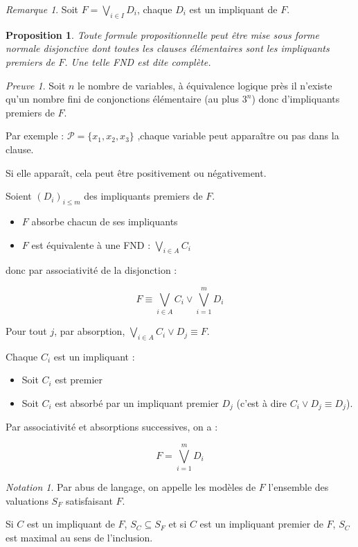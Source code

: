 \documentclass[]{article}
\newtheorem{myproposition}{Proposition}
\theoremstyle{remark}
\newtheorem{mynot}{Notation}
\newtheorem{myrem}{Remarque}
\newtheorem{myproof}{Preuve}
\theoremstyle{definition}
\begin{document}
\begin{myrem}
	Soit $\displaystyle F=\bigvee_{i \in I} D_i$, chaque $D_i$ est un impliquant de $F$.
\end{myrem}

\begin{myproposition}
	Toute formule propositionnelle peut être mise sous forme normale disjonctive dont toutes les clauses élémentaires sont les impliquants premiers de $F$. Une telle FND est dite \textit{complète}.
\end{myproposition}

\begin{myproof}
	Soit $n$ le nombre de variables, à équivalence logique près il n'existe qu'un nombre fini de conjonctions élémentaire (au plus $3^n$) donc d'impliquants premiers de $F$.

	Par exemple :
		$\mathcal{P}=\{x_1, x_2, x_3\}$ ,chaque variable peut apparaître ou pas dans la clause.
		
		Si elle apparaît, cela peut être positivement ou négativement.
	
	Soient $(D_i)_{i \leqslant m}$ des impliquants premiers de $F$.
	
	\begin{itemize}
		\item $F$ absorbe chacun de ses impliquants
		\item $F$ est équivalente à une FND : $\displaystyle \bigvee_{i \in A}C_i$
	\end{itemize}
	
	donc par associativité de la disjonction :
	
	$$F \equiv \bigvee_{i \in A} C_i \lor \bigvee_{i = 1}^m D_i$$
	
	Pour tout $j$, par absorption, $\displaystyle \bigvee_{i \in A} C_i \lor D_j \equiv F$.
	
	Chaque $C_i$ est un impliquant :
	\begin{itemize}
		\item Soit $C_i$ est premier
		\item Soit $C_i$ est absorbé par un impliquant premier $D_j$ (c'est à dire $C_i \lor D_j \equiv D_j$).
	\end{itemize}
	
	Par associativité et absorptions successives, on a :
	
	$$F = \bigvee_{i = 1}^m D_i$$
\end{myproof}

\begin{mynot}
	Par abus de langage, on appelle les modèles de $F$ l'ensemble des valuations $S_F$ satisfaisant $F$.
	
	Si $C$ est un impliquant de $F$, $S_C \subseteq S_F$ et si $C$ est un impliquant premier de $F$, $S_C$ est maximal au sens de l'inclusion.
\end{mynot}
\end{document}
